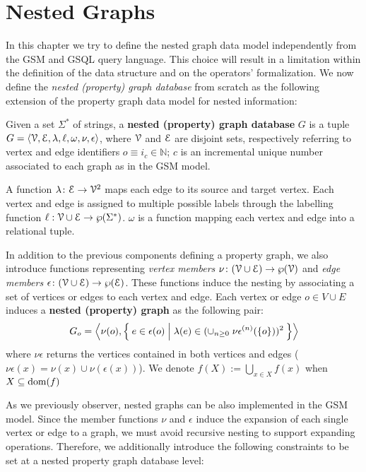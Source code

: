 \section{Nested Graphs}
\label{sec:model}
In this chapter we try to define the nested graph data model independently from the GSM and GSQL query language. This choice will result in a limitation within the definition of the data structure and on the operators' formalization. We now define the\textit{ nested (property) graph database} from scratch as the following extension of the property graph data model for nested information:

\begin{definition}
	Given a set $\Sigma^*$ of strings,
	a \textbf{nested (property) graph database} $G$ is a tuple $G=\Braket{\mathcal{V}, \mathcal{E}, \lambda,\ell,\omega,\nu,\epsilon}$, where $\mathcal{V}$ and $\mathcal{E}$ are disjoint sets, respectively referring to vertex and edge identifiers $o\equiv i_c\in\mathbb{N}$; $c$ is an incremental unique number associated to each graph as in the GSM model. 
	
	A function $\lambda\colon \mathcal{E}\to \mathcal{V}^2$ maps each edge to its source and target vertex. Each vertex and edge is assigned to multiple possible labels through the labelling function $\ell:\mathcal{V}\cup \mathcal{E}\to \wp(\Sigma^*)$.  $\omega$ is a function mapping each vertex and edge into a relational tuple.
	
	In addition to the previous components defining a property graph, we also introduce functions representing \textit{vertex members} $\nu\colon (\mathcal{V}\cup \mathcal{E})\to\wp(\mathcal{V})$ and \textit{edge members} $\epsilon\colon(\mathcal{V}\cup \mathcal{E})\to \wp(\mathcal{E})$. These functions induce the nesting by associating a set of vertices or edges to each vertex and edge. Each vertex or edge $o\in V\cup E$ induces a \textbf{nested (property) graph} as the following pair:
	\[G_o=\Braket{\nu(o),\Set{e\in\epsilon(o)|\lambda(e)\in (\cup_{n\geq 0}\;{\nu\epsilon}^{(n)}(\{o\}))^2}}\]
	where ${\nu\epsilon}$ returns the vertices contained in both vertices and edges ($\nu\epsilon(x)=\nu(x)\cup \nu(\epsilon(x))$). We denote $f(X){:=}\bigcup_{x\in X} f(x)$ when $X\subseteq \textup{dom}(f)$
\end{definition}


As we previously observer, nested graphs can be also implemented in the GSM model. Since the member functions $\nu$ and $\epsilon$ induce the expansion of each single vertex or edge to a graph, we must avoid recursive nesting to support expanding operations.
Therefore, we additionally introduce the following constraints to be set at a nested property graph database level:

